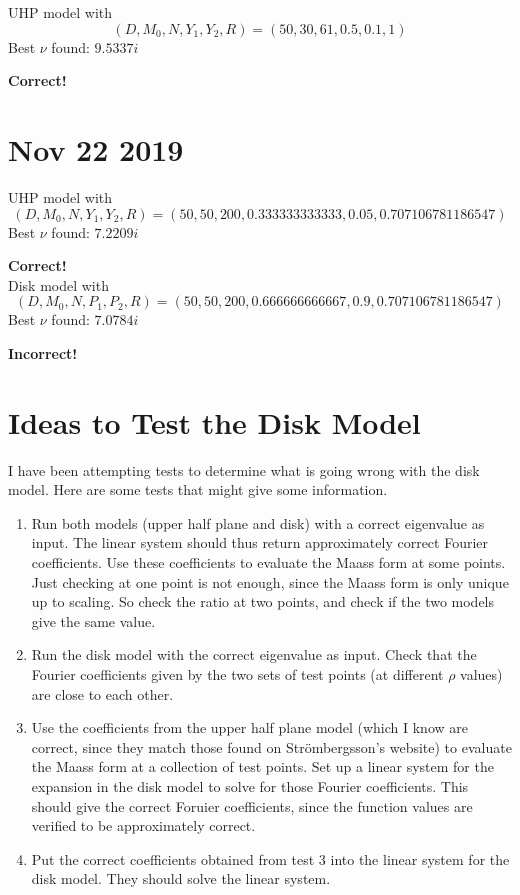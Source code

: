 \documentclass[]{article}
\begin{document}
	UHP model with
	$$
	(D, M_0, N, Y_1, Y_2, R) =
	( 50,30,61,0.5,0.1,1 )
	$$
	Best $\nu$ found: $9.5337i$
	
	\textbf{Correct!}
	
	\section*{Nov 22 2019}
	
	UHP model with
	$$
	(D, M_0, N, Y_1, Y_2, R) =
	( 50,50,200,0.333333333333,0.05,0.707106781186547 )
	$$
	Best $\nu$ found: $7.2209i$
	
	\textbf{Correct!}
	\\
	
	Disk model with
	$$
	(D, M_0, N, P_1, P_2, R) =
	( 50,50,200,0.666666666667,0.9,0.707106781186547 )
	$$
	Best $\nu$ found: $7.0784i$
	
	\textbf{Incorrect!}
	
	\section*{Ideas to Test the Disk Model}
	
	I have been attempting tests to determine what is going wrong with the disk model.
	Here are some tests that might give some information.
	\begin{enumerate}
		\item Run both models (upper half plane and disk) with a correct eigenvalue as input.
		The linear system should thus return approximately correct Fourier coefficients.
		Use these coefficients to evaluate the Maass form at some points.
		Just checking at one point is not enough, since the Maass form is only unique up to scaling.
		So check the ratio at two points, and check if the two models give the same value.
		\item Run the disk model with the correct eigenvalue as input.
		Check that the Fourier coefficients given by the two sets of test points (at different $\rho$ values) are close to each other.
		\item Use the coefficients from the upper half plane model (which I know are correct, since they match those found on Str\"ombergsson's website) to evaluate the Maass form at a collection of test points.
		Set up a linear system for the expansion in the disk model to solve for those Fourier coefficients.
		This should give the correct Foruier coefficients, since the function values are verified to be approximately correct.
		\item Put the correct coefficients obtained from test 3 into the linear system for the disk model.
		They should solve the linear system.
	\end{enumerate}
	
\end{document}
